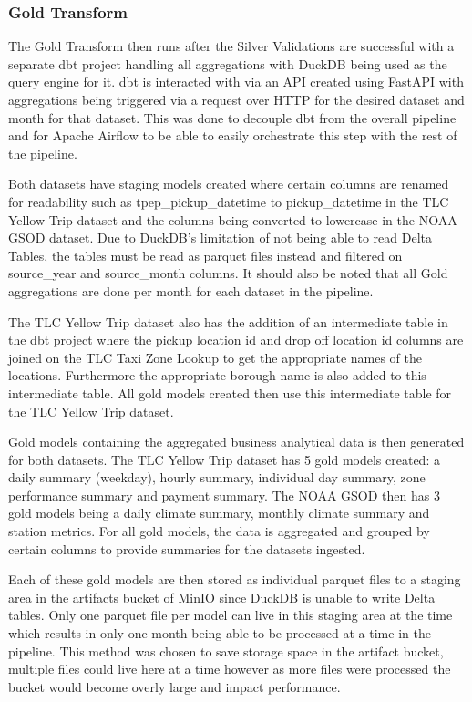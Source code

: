 \documentclass[conference]{IEEEtran}
\begin{document}
\subsubsection{Gold Transform}

The Gold Transform then runs after the Silver Validations are successful with a separate dbt project handling all aggregations with DuckDB being used as the query engine for it. dbt is interacted with via an API created using FastAPI with aggregations being triggered via a request over HTTP for the desired dataset and month for that dataset. This was done to decouple dbt from the overall pipeline and for Apache Airflow to be able to easily orchestrate this step with the rest of the pipeline.

Both datasets have staging models created where certain columns are renamed for readability such as tpep\_pickup\_datetime to pickup\_datetime in the TLC Yellow Trip dataset and the columns being converted to lowercase in the NOAA GSOD dataset. Due to DuckDB's limitation of not being able to read Delta Tables, the tables must be read as parquet files instead and filtered on source\_year and source\_month columns. It should also be noted that all Gold aggregations are done per month for each dataset in the pipeline.

The TLC Yellow Trip dataset also has the addition of an intermediate table in the dbt project where the pickup location id and drop off location id columns are joined on the TLC Taxi Zone Lookup to get the appropriate names of the locations. Furthermore the appropriate borough name is also added to this intermediate table. All gold models created then use this intermediate table for the TLC Yellow Trip dataset.

Gold models containing the aggregated business analytical data is then generated for both datasets. The TLC Yellow Trip dataset has 5 gold models created: a daily summary (weekday), hourly summary, individual day summary, zone performance summary and payment summary. The NOAA GSOD then has 3 gold models being a daily climate summary, monthly climate summary and station metrics. For all gold models, the data is aggregated and grouped by certain columns to provide summaries for the datasets ingested. 

Each of these gold models are then stored as individual parquet files to a staging area in the artifacts bucket of MinIO since DuckDB is unable to write Delta tables. Only one parquet file per model can live in this staging area at the time which results in only one month being able to be processed at a time in the pipeline. This method was chosen to save storage space in the artifact bucket, multiple files could live here at a time however as more files were processed the bucket would become overly large and impact performance.
\end{document}
